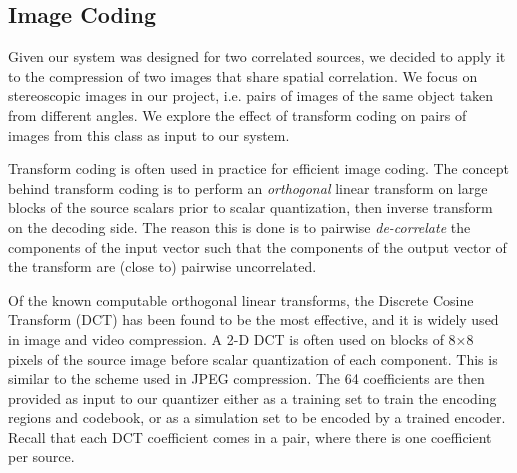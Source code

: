 \documentclass[10pt,twoside,titlepage]{article}
\begin{document}
\subsection{Image Coding}

Given our system was designed for two correlated sources, we decided to apply it to the compression of two images that share spatial correlation. We focus on stereoscopic images in our project, i.e. pairs of images of the same object taken from different angles. We explore the effect of transform coding on pairs of images from this class as input to our system.

Transform coding is often used in practice for efficient image coding. The concept behind transform coding is to perform an \emph{orthogonal} linear transform on large blocks of the source scalars prior to scalar quantization, then inverse transform on the decoding side. The reason this is done is to pairwise \emph{de-correlate} the components of the input vector such that the components of the output vector of the transform are (close to) pairwise uncorrelated.

Of the known computable orthogonal linear transforms, the Discrete Cosine Transform (DCT) has been found to be the most effective, and it is widely used in image and video compression. A 2-D DCT is often used on blocks of 8$\times$8 pixels of the source image before scalar quantization of each component. This is similar to the scheme used in JPEG compression. The 64 coefficients are then provided as input to our quantizer either as a training set to train the encoding regions and codebook, or as a simulation set to be encoded by a trained encoder. Recall that each DCT coefficient comes in a pair, where there is one coefficient per source.

\medskip
\end{document}
